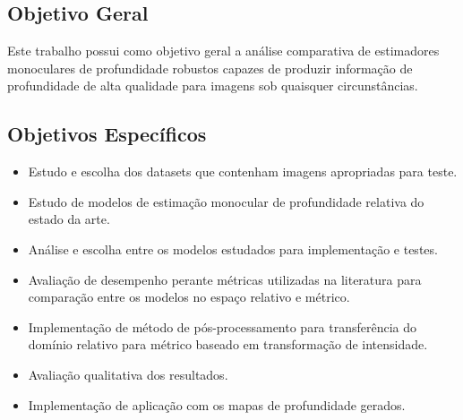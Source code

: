 \subsection{Objetivo Geral}
Este trabalho possui como objetivo geral a análise comparativa de estimadores monoculares de profundidade robustos capazes de produzir informação de profundidade de alta qualidade para imagens sob quaisquer circunstâncias.

\subsection{Objetivos Específicos}

\begin{itemize}
    \item Estudo e escolha dos datasets que contenham imagens apropriadas para teste.
    \item Estudo de modelos de estimação monocular de profundidade relativa do estado da arte.
    \item Análise e escolha entre os modelos estudados para implementação e testes.
    \item Avaliação de desempenho perante métricas utilizadas na literatura para comparação entre os modelos no espaço relativo e métrico.
    \item Implementação de método de pós-processamento para transferência do domínio relativo para métrico baseado em transformação de intensidade.
    \item Avaliação qualitativa dos resultados.
    \item Implementação de aplicação com os mapas de profundidade gerados.
    
\end{itemize}

